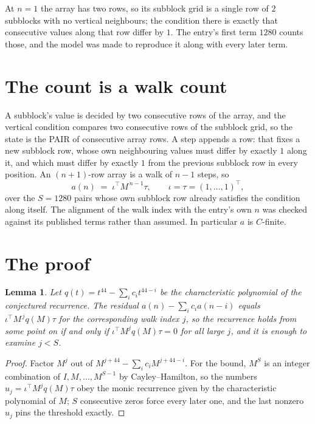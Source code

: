 \documentclass[11pt,a4paper]{article}
\theoremstyle{plain}
\newtheorem{lemma}[theorem]{Lemma}
\theoremstyle{definition}
\begin{document}
At $n=1$ the array has two rows, so its subblock grid is a single row of $2$ subblocks with
no vertical neighbours; the condition there is exactly that consecutive values along that row
differ by $1$. The entry's first term $1280$ counts those, and the model was made to
reproduce it along with every later term.

\section{The count is a walk count}

A subblock's value is decided by two consecutive rows of the array, and the
vertical condition compares two consecutive rows of the subblock grid, so the state is the
PAIR of consecutive array rows. A step appends a row: that fixes a new subblock row, whose own
neighbouring values must differ by exactly $1$ along it, and which must differ by exactly
$1$ from the previous subblock row in every position. An $(n+1)$-row array is a walk of
$n-1$ steps, so
\[
a(n)\;=\;\iota^{\!\top}M^{\,n-1}\tau,\qquad\iota=\tau=(1,\dots,1)^{\!\top},
\]
over the $S=1280$ pairs whose own subblock row already satisfies the condition along itself.
The alignment of the walk index with the entry's own $n$ was checked against its published
terms rather than assumed. In particular $a$ is $C$-finite.

\section{The proof}

\begin{lemma}\label{lem:crit}
Let $q(t)=t^{44}-\sum_i c_it^{44-i}$ be the characteristic polynomial of the
conjectured recurrence. The residual $a(n)-\sum_ic_ia(n-i)$ equals
$\iota^{\!\top}M^{\,j}q(M)\tau$ for the corresponding walk index $j$, so the recurrence
holds from some point on if and only if $\iota^{\!\top}M^{j}q(M)\tau=0$ for all large $j$,
and it is enough to examine $j<S$.
\end{lemma}

\begin{proof}
Factor $M^{j}$ out of $M^{j+44}-\sum_ic_iM^{j+44-i}$. For the bound, $M^{S}$
is an integer combination of $I,M,\dots,M^{S-1}$ by Cayley--Hamilton, so the numbers
$u_j=\iota^{\!\top}M^{j}q(M)\tau$ obey the monic recurrence given by the characteristic
polynomial of $M$; $S$ consecutive zeros force every later one, and the last nonzero $u_j$
pins the threshold exactly.
\end{proof}
\end{document}
